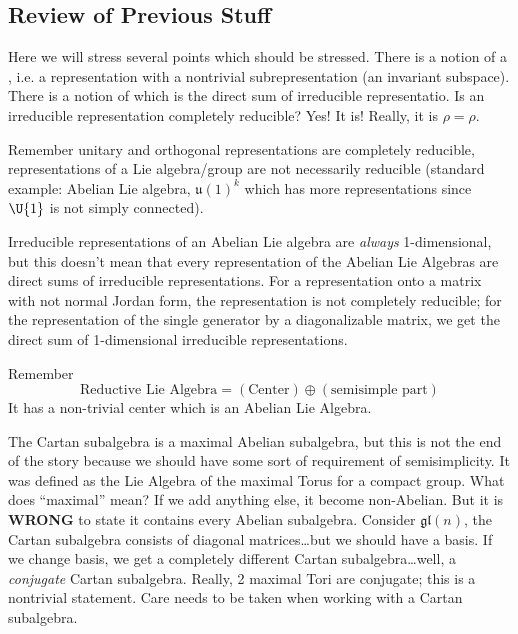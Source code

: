 \subsection{Review of Previous Stuff}
Here we will stress several points which should be
stressed. There is a notion of a , i.e. a representation with a nontrivial
subrepresentation (an invariant subspace). There is a notion of
 which is the direct
sum of irreducible representatio. Is an irreducible
representation completely reducible? Yes! It is! Really, it is
$\rho=\rho$. 

Remember unitary and orthogonal representations are completely
reducible, representations of a Lie algebra/group are not
necessarily reducible (standard example: Abelian Lie algebra,
$\mathfrak{u}(1)^{k}$ which has more representations since
$\U{1}$ is not simply connected).

Irreducible representations of an Abelian Lie algebra are
\emph{always} 1-dimensional, but this doesn't mean that every
representation of the Abelian Lie Algebras are direct sums of
irreducible representations. For a representation onto a matrix
with not normal Jordan form, the representation is not completely
reducible; for the representation of the single generator by a
diagonalizable matrix, we get the direct sum of 1-dimensional
irreducible representations.

Remember
\begin{equation}
\mbox{Reductive Lie
  Algebra}=(\mbox{Center})\oplus(\mbox{semisimple part})
\end{equation}
It has a non-trivial center which is an Abelian Lie Algebra.

The Cartan subalgebra is a maximal Abelian subalgebra, but this
is not the end of the story because we should have some sort of
requirement of semisimplicity. It was defined as the Lie Algebra
of the maximal Torus for a compact group. What does ``maximal''
mean? If we add anything else, it become non-Abelian. But it is
\textbf{WRONG} to state it contains every Abelian
subalgebra. Consider $\mathfrak{gl}(n)$, the Cartan subalgebra
consists of diagonal matrices\dots but we should have a basis. If
we change basis, we get a completely different Cartan
subalgebra\dots well, a \emph{conjugate} Cartan
subalgebra. Really, 2 maximal Tori are conjugate; this is a
nontrivial statement. Care needs to be taken when working with a
Cartan subalgebra.

